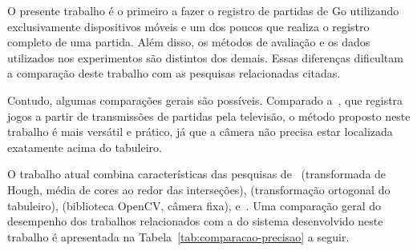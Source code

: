 O presente trabalho é o primeiro a fazer o registro de partidas de Go utilizando exclusivamente dispositivos móveis e um dos poucos que realiza o registro completo de uma partida. Além disso, os métodos de avaliação e os dados utilizados nos experimentos são distintos dos demais. %
Essas diferenças dificultam a comparação deste trabalho com as pesquisas relacionadas citadas.

Contudo, algumas comparações gerais são possíveis. Comparado a~, que registra jogos a partir de transmissões de partidas pela televisão, o método proposto neste trabalho é mais versátil e prático, já que a câmera não precisa estar localizada exatamente acima do tabuleiro.%

O trabalho atual combina características das pesquisas de~ (transformada de Hough, média de cores ao redor das interseções),  (transformação ortogonal do tabuleiro),  (biblioteca OpenCV, câmera fixa),  e~. Uma comparação geral do desempenho dos trabalhos relacionados com a do sistema desenvolvido neste trabalho é apresentada na Tabela~\ref{tab:comparacao-precisao} a seguir.

